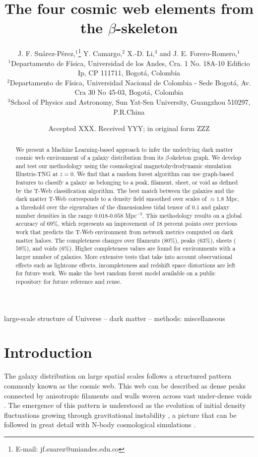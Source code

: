 \documentclass[usenatbib]{mnras}
\title[Cosmic web elements from the $\beta$-skeleton]{The four cosmic web elements from the $\beta$-skeleton}
\author[J. F. Su\'arez-P\'erez et al.]{
J. F. Su\'arez-P\'erez,$^{1}$\thanks{E-mail: jf.suarez@uniandes.edu.co}
Y. Camargo,$^{2}$ 
X.-D. Li,$^{3}$
and J. E. Forero-Romero,$^{1}$
\\
$^{1}$Departamento de F\'isica, Universidad de los Andes, Cra. 1
No. 18A-10 Edificio Ip, CP 111711, Bogot\'a, Colombia\\ 
$^{2}$Departamento de F\'isica, Universidad Nacional de Colombia -
Sede Bogot\'a, Av. Cra 30 No 45-03, Bogot\'a, Colombia\\ 
$^{3}$School of Physics and Astronomy, Sun Yat-Sen University,
Guangzhou 510297, P.R.China\\ 
}
\date{Accepted XXX. Received YYY; in original form ZZZ}
\begin{document}
\label{firstpage}
\pagerange{\pageref{firstpage}--\pageref{lastpage}}
\maketitle

\begin{abstract}
We present a Machine Learning-based approach to infer the underlying dark matter cosmic web environment of a galaxy distribution from its $\beta$-skeleton graph.
We develop and test our methodology using the cosmological magnetohydrodynamic simulation Illustris-TNG at $z=0$.
We find that a random forest algorithm can use graph-based features to classify a galaxy as belonging to a peak, filament, sheet, or void as defined by the T-Web classification algorithm.
The best match between the galaxies and the dark matter T-Web corresponds to a density field smoothed over scales of $\approx 1.8$ Mpc, a threshold over the eigenvalues of the dimensionless tidal tensor of $0.1$
and galaxy number densities in the range $0.018$-$0.058$ Mpc$^{-3}$.
This methodology results on a global accuracy of $69\%$, which represents an improvement of $18$ percent points over previous work that predicts the T-Web environment from network metrics computed on dark matter haloes.
The completeness changes over filaments ($80\%$), peaks ($63\%$), sheets ($59\%$), and voids ($6\%$).
Higher completeness values are found for environments with a larger number of galaxies.
More extensive tests that take into account observational effects such as lightcone effects, incompleteness and redshift space distortions are left for future work.
We make the best random forest model available on a public repository for future reference and reuse.
\end{abstract}

\begin{keywords}
large-scale structure of Universe -- dark matter -- methods: miscellaneous
\end{keywords}


\section{Introduction}
The galaxy distribution on large spatial scales follows a structured 
pattern commonly known as the cosmic web. 
This web can be described as dense peaks connected by anisotropic
filaments and walls woven across vast under-dense voids 
\citep{Bond1996}.  
The emergence of this pattern is understood as the evolution of
initial density fluctuations growing through gravitational instability
\citep{ZelDovich1970,White1987}, a picture that can be followed in
great detail with N-body cosmological simulations
\citep{Schmalzing1999,Vogelsberger2014}.     
\end{document}
